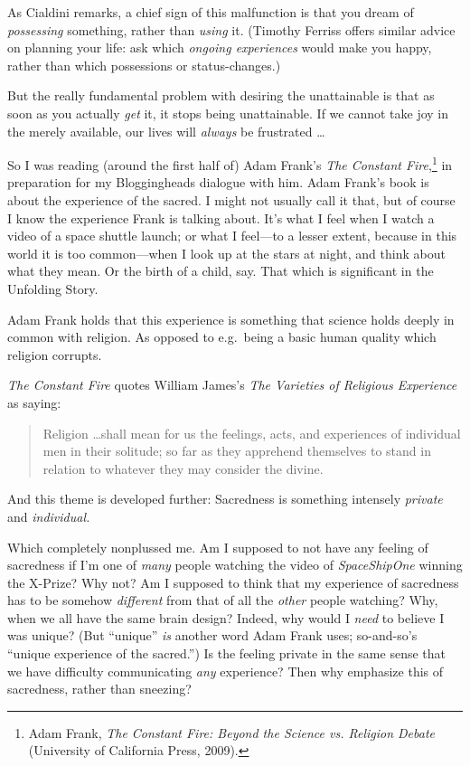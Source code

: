 {
 As Cialdini remarks, a chief sign of this malfunction is that you
dream of \textit{possessing} something, rather than \textit{using} it.
(Timothy Ferriss offers similar advice on planning your life: ask which
\textit{ongoing experiences} would make you happy, rather than which
possessions or status-changes.)}

{
 But the really fundamental problem with desiring the unattainable
is that as soon as you actually \textit{get} it, it stops being
unattainable. If we cannot take joy in the merely available, our lives
will \textit{always} be frustrated \ldots}

\myendsectiontext


\bigskip


{
 So I was reading (around the first half of) Adam
Frank's \textit{The Constant Fire},\footnote{Adam Frank, \textit{The Constant Fire: Beyond the Science vs.
Religion Debate} (University of California Press, 2009).}
in preparation for my Bloggingheads dialogue with him. Adam
Frank's book is about the experience of the sacred. I
might not usually call it that, but of course I know the experience
Frank is talking about. It's what I feel when I watch a
video of a space shuttle launch; or what I feel---to a lesser extent,
because in this world it is too common---when I look up at the stars at
night, and think about what they mean. Or the birth of a child, say.
That which is significant in the Unfolding Story. }

{
 Adam Frank holds that this experience is something that science
holds deeply in common with religion. As opposed to e.g.~being a basic
human quality which religion corrupts.}

{
 \textit{The Constant Fire} quotes William James's
\textit{The Varieties of Religious Experience} as saying:}

\begin{quote}
{
 Religion \ldots shall mean for us the feelings, acts, and
experiences of individual men in their solitude; so far as they
apprehend themselves to stand in relation to whatever they may consider
the divine.}
\end{quote}

{
 And this theme is developed further: Sacredness is something
intensely \textit{private} and \textit{individual.}}

{
 Which completely nonplussed me. Am I supposed to not have any
feeling of sacredness if I'm one of \textit{many}
people watching the video of \textit{SpaceShipOne} winning the X-Prize?
Why not? Am I supposed to think that my experience of sacredness has to
be somehow \textit{different} from that of all the \textit{other}
people watching? Why, when we all have the same brain design? Indeed,
why would I \textit{need} to believe I was unique? (But
``unique'' \textit{is} another word
Adam Frank uses; so-and-so's ``unique
experience of the sacred.'') Is the feeling private
in the same sense that we have difficulty communicating \textit{any}
experience? Then why emphasize this of sacredness, rather than
sneezing?}

